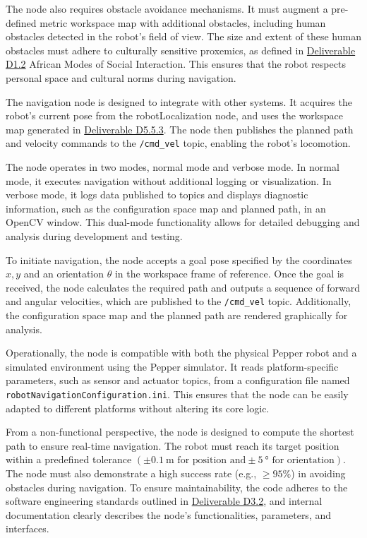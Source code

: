 \documentclass{CSSRforAfrica}
\begin{document}
\noindent The node also requires obstacle avoidance mechanisms. It must augment a pre-defined metric workspace map with additional obstacles, including human obstacles detected in the robot's field of view. The size and extent of these human obstacles must adhere to culturally sensitive proxemics, as defined in \href{https://cssr4africa.github.io/deliverables/CSSR4Africa_Deliverable_D1.2.pdf}{Deliverable D1.2} African Modes of Social Interaction. This ensures that the robot respects personal space and cultural norms during navigation.


\noindent The navigation node is designed to integrate with other systems. It acquires the robot’s current pose from the robotLocalization node, and uses the workspace map generated in \href{https://cssr4africa.github.io/deliverables/CSSR4Africa_Deliverable_D5.5.3.pdf}{Deliverable D5.5.3}. The node then publishes the planned path and velocity commands to the \texttt{/cmd\_vel} topic, enabling the robot’s locomotion.

\noindent The node operates in two modes, normal mode and verbose mode. In normal mode, it executes navigation without additional logging or visualization. In verbose mode, it logs data published to topics and displays diagnostic information, such as the configuration space map and planned path, in an OpenCV window. This dual-mode functionality allows for detailed debugging and analysis during development and testing.

\noindent To initiate navigation, the node accepts a goal pose specified by the coordinates $x, y$ and an orientation $\theta$ in the workspace frame of reference. Once the goal is received, the node calculates the required path and outputs a sequence of forward and angular velocities, which are published to the \texttt{/cmd\_vel} topic. Additionally, the configuration space map and the planned path are rendered graphically for analysis.

\noindent Operationally, the node is compatible with both the physical Pepper robot and a simulated environment using the Pepper simulator. It reads platform-specific parameters, such as sensor and actuator topics, from a configuration file named \verb|robotNavigationConfiguration.ini|. This ensures that the node can be easily adapted to different platforms without altering its core logic.

\noindent From a non-functional perspective, the node is designed to compute the shortest path to ensure real-time navigation. The robot must reach its target position within a predefined tolerance $(\pm \SI{0.1}{\meter} \text{ for position and} \pm \SI{5}{\degree}\text{ for orientation})$. The node must also demonstrate a high success rate (e.g., $\geq{95}$\%) in avoiding obstacles during navigation. To ensure maintainability, the code adheres to the software engineering standards outlined in \href{https://cssr4africa.github.io/deliverables/CSSR4Africa_Deliverable_D3.2.pdf}{Deliverable D3.2}, and internal documentation clearly describes the node’s functionalities, parameters, and interfaces.
\end{document}
